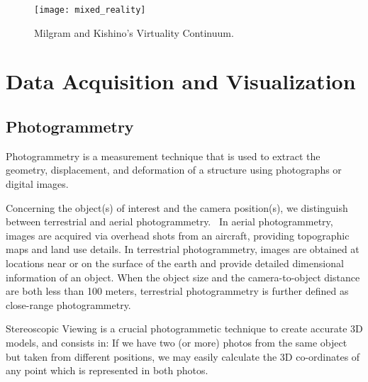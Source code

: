 \begin{figure}[htbp]
    \centering
    \texttt{[image: mixed\_reality]}
    \caption{Milgram and Kishino’s Virtuality Continuum. ~\cite{milgram1994taxonomy}}
    \label{fig:mixed_reality} 
\end{figure} 
\FloatBarrier


\section{ Data Acquisition and Visualization}
\label{sec:data}

\subsection{Photogrammetry}
\label{sec:photogrammetry}

Photogrammetry is a measurement technique that is used to extract the geometry, displacement, and deformation of a
structure using photographs or digital images.~\cite{Baqersad2017Photogrammetry}

Concerning the object(s) of interest and the camera position(s), we distinguish
between terrestrial and aerial photogrammetry.~\cite{linder2016digital}
In aerial photogrammetry, images are acquired via overhead shots from an aircraft, providing topographic maps and land use details. In terrestrial photogrammetry, images are obtained at locations near or on the surface of
the earth and provide detailed dimensional information of an object. When the object size and the camera-to-object 
distance are both less than 100 meters, terrestrial photogrammetry is further defined as close-range photogrammetry.


Stereoscopic Viewing is a crucial photogrammetic technique to create accurate \gls{3D} models, and consists in: If we have two (or more) photos
from the same object but taken from different positions, we may easily calculate the
\gls{3D} co-ordinates of any point which is represented in both photos.~\cite{linder2016digital}


